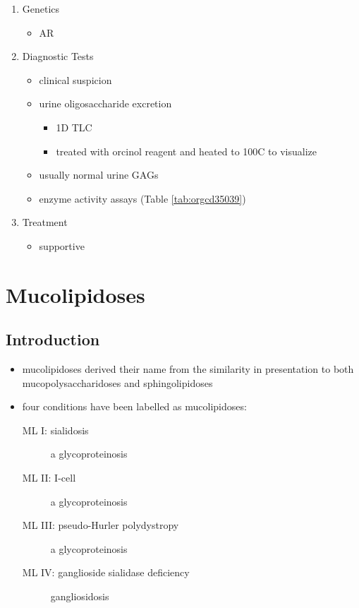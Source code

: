 \documentclass{scrartcl}
\begin{document}
\begin{enumerate}
\item Genetics
\label{sec:orgeaa0aa4}
\begin{itemize}
\item AR
\end{itemize}
\item Diagnostic Tests
\label{sec:orgf22b41f}
\begin{itemize}
\item clinical suspicion
\item urine oligosaccharide excretion
\begin{itemize}
\item 1D TLC
\item treated with orcinol reagent and heated to 100C to visualize
\end{itemize}
\item usually normal urine GAGs
\item enzyme activity assays (Table \ref{tab:orgcd35039})
\end{itemize}

\item Treatment
\label{sec:orgca98fd3}
\begin{itemize}
\item supportive
\end{itemize}
\end{enumerate}
\section{Mucolipidoses}
\label{sec:orgb69c046}
\subsection{Introduction}
\label{sec:org7adc380}
\begin{itemize}
\item mucolipidoses derived their name from the similarity in
presentation to both mucopolysaccharidoses and sphingolipidoses
\item four conditions have been labelled as mucolipidoses:
\begin{description}
\item[{ML I: sialidosis}] a glycoproteinosis
\item[{ML II: I-cell}] a glycoproteinosis
\item[{ML III: pseudo-Hurler polydystropy}] a glycoproteinosis
\item[{ML IV: ganglioside sialidase deficiency}] gangliosidosis
\end{description}
\end{itemize}
\end{document}

